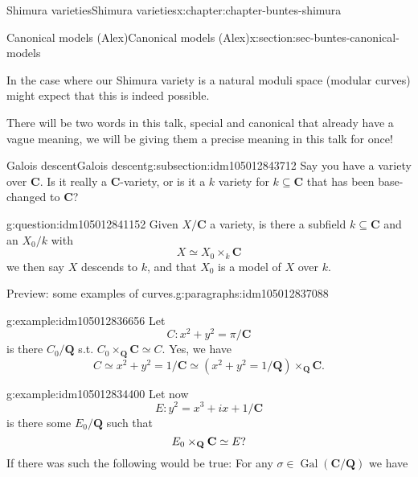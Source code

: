 \documentclass[oneside,10pt,]{book}
\numberwithin{equation}{section}
\newcommand{\QQ}{\mathbf{Q}}
\newcommand{\CC}{\mathbf{C}}
\newcommand{\Gal}[2]{\operatorname{Gal}(#1/#2)}
\begin{document}
\begin{chapterptx}{Shimura varieties}{}{Shimura varieties}{}{}{x:chapter:chapter-buntes-shimura}
\begin{sectionptx}{Canonical models (Alex)}{}{Canonical models (Alex)}{}{}{x:section:sec-buntes-canonical-models}
\begin{introduction}{}
\par
In the case where our Shimura variety is a natural moduli space (modular curves) might expect that this is indeed possible.%
\par
There will be two words in this talk, special and canonical that already have a vague meaning, we will be giving them a precise meaning in this talk for once!%
\end{introduction}%
%
%
\typeout{************************************************}
\typeout{************************************************}
%
\begin{subsectionptx}{Galois descent}{}{Galois descent}{}{}{g:subsection:idm105012843712}
Say you have a variety over \(\CC\). Is it really a \(\CC\)-variety, or is it a \(k\) variety for \(k \subseteq \CC\) that has been base-changed to \(\CC\)?%
\begin{question}{}{g:question:idm105012841152}%
Given \(X/\CC\) a variety, is there a subfield \(k \subseteq \CC\) and an \(X_0/k\) with%
\begin{equation*}
X \simeq X_0 \times_k \CC
\end{equation*}
we then say \(X\) descends to \(k\), and that \(X_0\) is a model of \(X\) over \(k\).%
\end{question}
\begin{paragraphs}{Preview: some examples of curves.}{g:paragraphs:idm105012837088}%
\begin{example}{}{g:example:idm105012836656}%
Let%
\begin{equation*}
C \colon x^2+ y^2 = \pi/\CC
\end{equation*}
is there \(C_0/\QQ\) s.t. \(C_0\times_\QQ \CC \simeq C\). Yes, we have%
\begin{equation*}
C \simeq x^2 + y^2 = 1/\CC \simeq (x^2 + y^2 = 1/\QQ )\times_{\QQ} \CC\text{.}
\end{equation*}
%
\end{example}
\begin{example}{}{g:example:idm105012834400}%
Let now%
\begin{equation*}
E \colon y^2 = x^3 + ix + 1/\CC
\end{equation*}
is there some \(E_0/\QQ\) such that%
\begin{equation*}
E_0\times_{\QQ} \CC  \simeq E\text ?
\end{equation*}
If there was such the following would be true: For any \(\sigma\in \Gal{\CC}{\QQ}\) we have%
\begin{equation*}

\end{equation*}
\end{example}
\end{paragraphs}
\end{subsectionptx}
\end{sectionptx}
\end{chapterptx}
\end{document}
